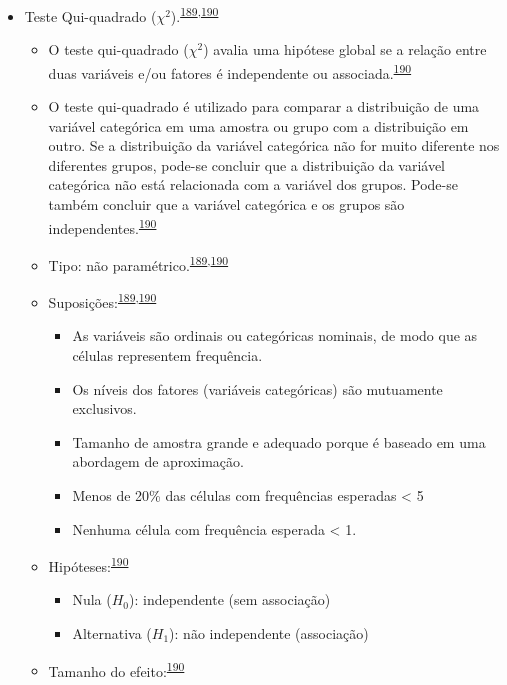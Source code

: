 \documentclass[
  a4paper,
]{book}
\begin{document}
\begin{itemize}
\item
  Teste Qui-quadrado (\(\chi^2\)).\textsuperscript{\protect\hyperlink{ref-McHugh2013}{189},\protect\hyperlink{ref-Kim2017a}{190}}

  \begin{itemize}
  \item
    O teste qui-quadrado (\(\chi^2\)) avalia uma hipótese global se a relação entre duas variáveis e/ou fatores é independente ou associada.\textsuperscript{\protect\hyperlink{ref-Kim2017a}{190}}
  \item
    O teste qui-quadrado é utilizado para comparar a distribuição de uma variável categórica em uma amostra ou grupo com a distribuição em outro. Se a distribuição da variável categórica não for muito diferente nos diferentes grupos, pode-se concluir que a distribuição da variável categórica não está relacionada com a variável dos grupos. Pode-se também concluir que a variável categórica e os grupos são independentes.\textsuperscript{\protect\hyperlink{ref-Kim2017a}{190}}
  \item
    Tipo: não paramétrico.\textsuperscript{\protect\hyperlink{ref-McHugh2013}{189},\protect\hyperlink{ref-Kim2017a}{190}}
  \item
    Suposições:\textsuperscript{\protect\hyperlink{ref-McHugh2013}{189},\protect\hyperlink{ref-Kim2017a}{190}}

    \begin{itemize}
    \item
      As variáveis são ordinais ou categóricas nominais, de modo que as células representem frequência.
    \item
      Os níveis dos fatores (variáveis categóricas) são mutuamente exclusivos.
    \item
      Tamanho de amostra grande e adequado porque é baseado em uma abordagem de aproximação.
    \item
      Menos de 20\% das células com frequências esperadas \textless{} 5
    \item
      Nenhuma célula com frequência esperada \textless{} 1.
    \end{itemize}
  \item
    Hipóteses:\textsuperscript{\protect\hyperlink{ref-Kim2017a}{190}}

    \begin{itemize}
    \item
      Nula (\(H_{0}\)): independente (sem associação)
    \item
      Alternativa (\(H_{1}\)): não independente (associação)
    \end{itemize}
  \item
    Tamanho do efeito:\textsuperscript{\protect\hyperlink{ref-Kim2017a}{190}}


\end{itemize}
\end{itemize}
\end{document}
